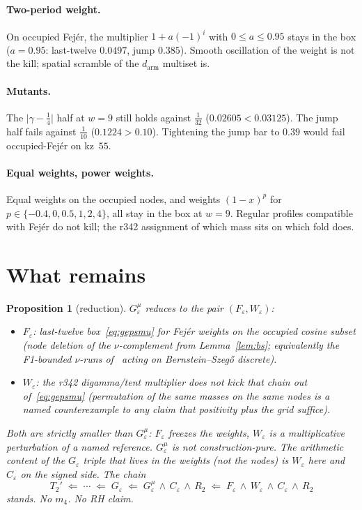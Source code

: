 \documentclass[11pt]{article}
\newtheorem{prop}{Proposition}
\theoremstyle{remark}
\newcommand{\eps}{\varepsilon}
\begin{document}
\paragraph{Two-period weight.}
On occupied Fej\'er, the multiplier $1+a(-1)^i$ with
$0\le a\le 0.95$ stays in the box ($a=0.95$: last-twelve $0.0497$,
jump $0.385$).
Smooth oscillation of the weight is not the kill; spatial
scramble of the $d_{\mathrm{arm}}$ multiset is.

\paragraph{Mutants.}
The $\lvert\gamma-\tfrac14\rvert$ half at $w=9$ still holds
against $\tfrac1{32}$ ($0.02605<0.03125$).
The jump half fails against $\tfrac1{10}$ ($0.1224>0.10$).
Tightening the jump bar to $0.39$ would fail occupied-Fej\'er
on kz~$55$.

\paragraph{Equal weights, power weights.}
Equal weights on the occupied nodes, and weights $(1-x)^p$ for
$p\in\{-0.4,0,0.5,1,2,4\}$, all stay in the box at $w=9$.
Regular profiles compatible with Fej\'er do not kill;
the r342 assignment of which mass sits on which fold does.

\section{What remains}\label{sec:rest}

\begin{prop}[reduction]\label{prop:red}
$G_\varepsilon^\mu$ reduces to the pair $(F_\eps,W_\eps)$:
\begin{itemize}
\item $F_\eps$: last-twelve box~\eqref{eq:gepsmu} for
Fej\'er weights on the occupied cosine subset (node deletion
of the $\nu$-complement from Lemma~\ref{lem:bs}; equivalently
the F1-bounded $\nu$-runs of~\cite{pivot} acting on
Bernstein--Szeg\H{o} discrete).
\item $W_\eps$: the r342 digamma/tent multiplier does not kick
that chain out of~\eqref{eq:gepsmu} (permutation of the same
masses on the same nodes is a named counterexample to any
claim that positivity plus the grid suffice).
\end{itemize}
Both are strictly smaller than $G_\varepsilon^\mu$:
$F_\eps$ freezes the weights, $W_\eps$ is a multiplicative
perturbation of a named reference.
$G_\varepsilon^\mu$ is not construction-pure.
The arithmetic content of the $G_\varepsilon$ triple that lives
in the \emph{weights} (not the nodes) is $W_\eps$ here and
$C_\varepsilon$ on the signed side.
The chain
\[
T_2'
 \;\Longleftarrow\;
 \cdots
 \;\Longleftarrow\;
 G_\varepsilon
 \;\Longleftarrow\;
 G_\varepsilon^\mu\,\wedge\,C_\varepsilon\,\wedge\,R_2
 \;\Longleftarrow\;
 F_\eps\,\wedge\,W_\eps\,\wedge\,C_\varepsilon\,\wedge\,R_2
\]
stands.  No $m_4$.  No RH claim.
\end{prop}
\end{document}
